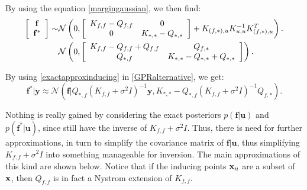 By using the equation \ref{margingaussian}, we then find:
\begin{equation}\label{exactapproxinducing}
\begin{split}
\left[ 
\begin{array}{c} 
\mathbf{f} \\
\mathbf{f^*} 
\end{array}\right] \sim & \mathcal{N} 
\left( 0 , 
\left[ 
\begin{array}{c c} 
K_{f,f} - Q_{f,f} & 0 \\
0 & K_{*,*} - Q_{*,*} 
\end{array} \right] + K_{(f,*),u} K_{u,u}^{-1} K_{(f,*),u}^T
\right). \\
& \mathcal{N} 
\left( 0 , 
\left[ 
\begin{array}{c c} 
K_{f,f} - Q_{f,f} + Q_{f,f}& Q_{f,*} \\
Q_{*,f} & K_{*,*} - Q_{*,*} + Q_{*,*}
\end{array} \right]\right).
\end{split}
\end{equation}

By using \eqref{exactapproxinducing} in \eqref{GPRalternative}, we get:
\begin{equation}
\mathbf{f}^*|\mathbf{y} \approx \mathcal{N}(\mathbf{f}|Q_{*,f}(K_{f,f} + \sigma^2 I)^{-1} \mathbf{y},K_{*,*} - Q_{*,f}(K_{f,f} + \sigma^2 I)^{-1} Q_{f,*}).
\end{equation}

Nothing is really gained by considering the exact posteriors $p(\mathbf{f}|\mathbf{u})$ and $p(\mathbf{f}^*|\mathbf{u})$, since  still have the inverse of $K_{f,f} + \sigma^2 I$. Thus, there is need for further approximations, in turn to simplify the covariance matrix of $\mathbf{f}|\mathbf{u}$, thus simplifying $K_{f,f} + \sigma^2 I$ into something manageable for inversion. The main approximations of this kind are shown below. Notice that if the inducing points ${\mathbf x}_u$ are a subset of ${\mathbf x}$, then $Q_{f,f}$ is in fact a Nystrom extension of $K_{f,f}$.


